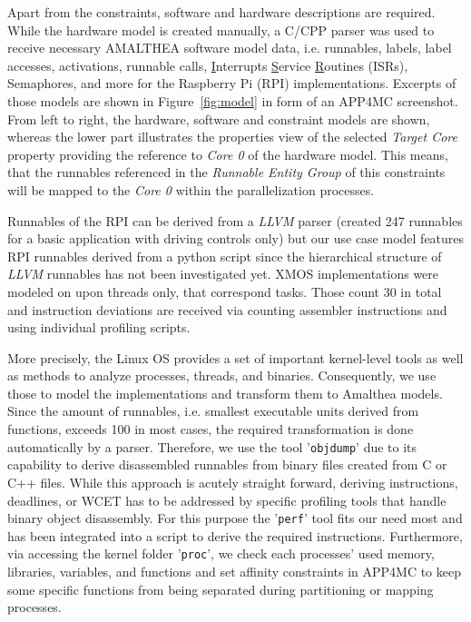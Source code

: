 \documentclass [a4paper,final,conference,10pt]{IDAACS}
\begin{document}
Apart from the constraints, software and hardware descriptions are required. While the hardware model is created manually, a C/CPP parser was used to receive necessary AMALTHEA software model data, i.e. runnables, labels, label accesses, activations, runnable calls, \underline{I}nterrupts \underline{S}ervice \underline{R}outines (ISRs), Semaphores, and more for the Raspberry Pi (RPI) implementations. Excerpts of those models are shown in Figure~\ref{fig:model} in form of an APP4MC screenshot. From left to right, the hardware, software and constraint models are shown, whereas the lower part illustrates the properties view of the selected \textit{Target Core} property providing the reference to \textit{Core 0} of the hardware model. This means, that the runnables referenced in the \textit{Runnable Entity Group} of this constraints will be mapped to the \textit{Core 0} within the parallelization processes. 

Runnables of the RPI can be derived from a \textit{LLVM} \cite{llvm} parser (created 247 runnables for a basic application with driving controls only) but our use case model features RPI runnables derived from a python script since the hierarchical structure of \textit{LLVM} runnables has not been investigated yet. XMOS implementations were modeled on upon threads only, that correspond tasks. Those count 30 in total and instruction deviations are received via counting assembler instructions and using individual profiling scripts.  

More precisely, the Linux OS provides a set of important kernel-level tools as well as methods to analyze processes, threads, and binaries. Consequently, we use those to model the implementations and transform them to Amalthea models. Since the amount of runnables, i.e. smallest executable units derived from functions, %
exceeds 100 in most cases, the required transformation is done automatically by a parser. Therefore, we use the tool '\texttt{objdump}' due to its capability to derive disassembled runnables from binary files created from C or C++ files. While this approach is acutely straight forward, deriving instructions, deadlines, or WCET has to be addressed by specific profiling tools that handle binary object disassembly. For this purpose the '\texttt{perf}' tool fits our need most and has been integrated into a script to derive the required instructions. 
Furthermore, via accessing the kernel folder '\texttt{proc}', we check each processes' used memory, libraries, variables, and functions and set affinity constraints in APP4MC to keep some specific functions from being separated during partitioning or mapping processes. 
\end{document}
